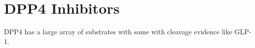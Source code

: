 \section{DPP4 Inhibitors}
DPP4 has a large array of substrates with some with cleavage evidence like GLP-1. 
